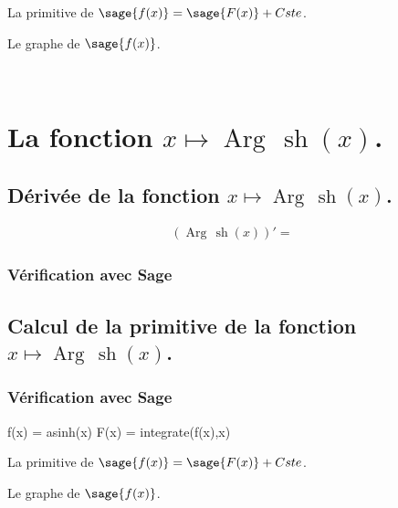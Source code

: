 \documentclass[a4paper,14pt]{extreport} %
\renewcommand{\sinh}{\mathop{\mathrm{sh}}}
\renewcommand{\arg}{\mathop{\mathrm{Arg\,}}}
\begin{document}
La primitive de $\sage{f(x)} = \sage{F(x)} +Cste$.

Le graphe de $\sage{f(x)} $.


\begin{center}
 \\
\end{center}







\section{La fonction  $x \mapsto \arg \sinh(x)$.}


\subsection{Dérivée de la fonction $x \mapsto \arg \sinh(x)$.}

\begin{align*}
(\arg \sinh(x))' = &
\end{align*}


\subsubsection{Vérification avec Sage}



\subsection{Calcul de la primitive de la fonction  $x \mapsto \arg \sinh(x)$.}




\subsubsection{Vérification avec Sage}

\begin{sageblock}
    f(x) = asinh(x)
    F(x) = integrate(f(x),x)
\end{sageblock}


La primitive de $\sage{f(x)} = \sage{F(x)} + Cste $.



Le graphe de $\sage{f(x)} $.


\begin{center}
 \\
\end{center}
\end{document}
